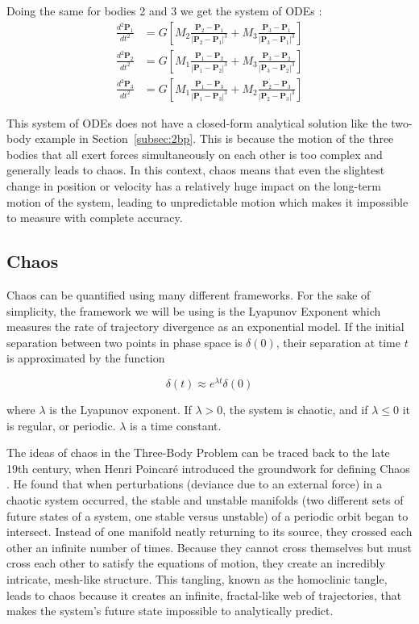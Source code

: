 \documentclass[12pt]{article}
\begin{document}
Doing the same for bodies 2 and 3 we get the system of ODEs \citep{murray1999solar}:
\begin{align*}
\frac{d^2\mathbf{P}_1}{dt^2} &= G \left[ M_2 \frac{\mathbf{P}_2 - \mathbf{P}_1}{|\mathbf{P}_2 - \mathbf{P}_1|^3} + M_3 \frac{\mathbf{P}_3 - \mathbf{P}_1}{|\mathbf{P}_3 - \mathbf{P}_1|^3} \right] \\[1em]
\frac{d^2\mathbf{P}_2}{dt^2} &= G \left[ M_1 \frac{\mathbf{P}_1 - \mathbf{P}_2}{|\mathbf{P}_1 - \mathbf{P}_2|^3} + M_3 \frac{\mathbf{P}_3 - \mathbf{P}_2}{|\mathbf{P}_3 - \mathbf{P}_2|^3} \right] \\[1em]
\frac{d^2\mathbf{P}_3}{dt^2} &= G \left[ M_1 \frac{\mathbf{P}_1 - \mathbf{P}_3}{|\mathbf{P}_1 - \mathbf{P}_3|^3} + M_2 \frac{\mathbf{P}_2 - \mathbf{P}_3}{|\mathbf{P}_2 - \mathbf{P}_3|^3} \right]
\end{align*}

This system of ODEs does not have a closed-form analytical solution like the two-body example in Section~\ref{subsec:2bp}. This is because the motion of the three bodies that all exert forces simultaneously on each other is too complex and generally leads to chaos. In this context, chaos means that even the slightest change in position or velocity has a relatively huge impact on the long-term motion of the system, leading to unpredictable motion which makes it impossible to measure with complete accuracy.

\subsection{Chaos}
\label{Chaos}
Chaos can be quantified using many different frameworks. For the sake of simplicity, the framework we will be using is the Lyapunov Exponent \citep{ott2002chaos} which measures the rate of trajectory divergence as an exponential model. If the initial separation between two points in phase space is $\delta(0)$, their separation at time $t$ is approximated by the function

$$\delta(t) \approx e^{\lambda t} \delta(0)$$

where $\lambda$ is the Lyapunov exponent. If $\lambda > 0$, the system is chaotic, and if $\lambda \leq 0$ it is regular, or periodic. $\lambda$ is a time constant.

The ideas of chaos in the Three-Body Problem can be traced back to the late 19th century, when Henri Poincaré introduced the groundwork for defining Chaos \citep{poincare1890sur}. He found that when perturbations (deviance due to an external force) in a chaotic system occurred, the stable and unstable manifolds (two different sets of future states of a system, one stable versus unstable) of a periodic orbit began to intersect. Instead of one manifold neatly returning to its source, they crossed each other an infinite number of times. Because they cannot cross themselves but must cross each other to satisfy the equations of motion, they create an incredibly intricate, mesh-like structure. This tangling, known as the homoclinic tangle, leads to chaos because it creates an infinite, fractal-like web of trajectories, that makes the system's future state impossible to analytically predict.
\end{document}
